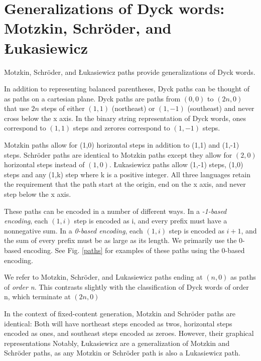 \chapter{Generalizations of Dyck words: Motzkin, Schröder, and Łukasiewicz}
Motzkin, Schröder, and Łukasiewicz paths provide generalizations of Dyck words.  

In addition to representing balanced parentheses, Dyck paths can be thought of as paths on a cartesian plane.  Dyck paths are paths from $(0,0)$ to $(2n,0)$ that use $2n$ steps of either $(1,1)$ (northeast) or $(1,-1)$ (southeast) and never cross below the x axis. In the binary string representation of Dyck words, ones correspond to $(1,1)$ steps and zerores correspond to $(1,-1)$ steps.

Motzkin paths allow for (1,0) horizontal steps in addition to (1,1) and (1,-1) steps. Schröder paths are identical to Motzkin paths except they allow for $(2,0)$ horizontal steps instead of $(1,0)$.  Łukasiewicz paths allow (1,-1) steps, (1,0) steps and any (1,k) step where k is a positive integer.  All three languages retain the requirement that the path start at the origin, end on the x axis, and never step below the x axis. 

These paths can be encoded in a number of different ways.  In a \emph{-1-based encoding}, each $(1,i)$ step is encoded as i, and every prefix must have a nonnegative sum.  In a \emph{0-based encoding}, each $(1,i)$ step is encoded as $i+1$, and the sum of every prefix must be as large as its length. We primarily use the 0-based encoding. See Fig. \ref{paths}  for examples of these paths using the 0-based encoding.

We refer to Motzkin, Schröder, and Lukasiewicz paths ending at $(n,0)$ as paths of \emph{order n}.  This contrasts slightly with the classification of Dyck words of order n, which terminate at $(2n,0)$

In the context of fixed-content generation, Motzkin and Schröder paths are identical:  Both will have northeast steps encoded as twos, horizontal steps encoded as ones, and southeast steps encoded as zeroes.  However, their graphical representations Notably, Łukasiewicz are a generalization of Motzkin and Schröder paths, as any Motzkin or Schröder path is also a Lukasiewicz path.

\bigskip

